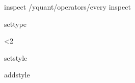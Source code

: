 \yquant@langhelper@declare@command@uncontrolled%
   {inspect}%
   \yquant@register@get@allowmultitrue%
   {%
      \expandafter\yquant@prepare%
         \expandafter{\yquant@lang@attr@value}%
         {/yquant/operators/every inspect}%
   }

\yquant@langhelper@declare@command@uncontrolled%
   {settype}%
   {}%
   {%
      \yquant@register@type@fromstring\yquant@lang@attr@value\yquant@circuit@settype@to%
      \yquant@circuit@actonwires%
         \yquant@circuit@settype@prepare%
         \yquant@circuit@settype%
         \yquant@circuit@operator@targets%
         {}%
   }

\ifnum\yquant@compat<2 %
   \def\yquant@lang@setwire{%
      \PackageWarning{yquant.sty}{`setwire' gate is deprecated as of yquant 0.1.2. Use `settype' instead.}%
      \yquant@lang@settype%
   }
\fi

\yquant@langhelper@declare@command@uncontrolled%
   {setstyle}%
   {}%
   {%
      \yquant@circuit@actonwires%
         \@gobbletwo%
         \yquant@circuit@setstyle%
         \yquant@circuit@operator@targets%
         {{\yquant@lang@attr@value}}%
   }

\yquant@langhelper@declare@command@uncontrolled%
   {addstyle}%
   {}%
   {%
      \yquant@circuit@actonwires%
         \@gobbletwo%
         \yquant@circuit@addstyle%
         \yquant@circuit@operator@targets%
         {{\yquant@lang@attr@value}}%
   }
